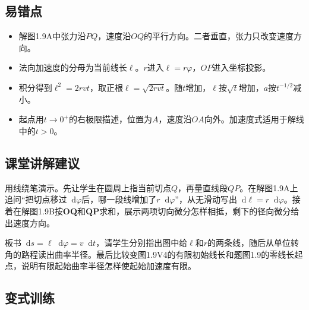 \documentclass[UTF8,fontset=fandol,a4paper,11pt]{ctexart}
\newcommand{\dd}{\mathop{}\!\mathrm{d}}
\newcommand{\vect}[1]{\bm{#1}}
\begin{document}


\subsection*{易错点}

\begin{itemize}
\item 解图1.9A中张力沿$PQ$，速度沿$OQ$的平行方向。二者垂直，张力只改变速度方向。
\item 法向加速度的分母为当前线长$\ell$。$r$进入$\ell=r\varphi$，$OP$进入坐标投影。
\item 积分得到$\ell^2=2rvt$，取正根$\ell=\sqrt{2rvt}$。随$t$增加，$\ell$按$\sqrt t$增加，$a$按$t^{-1/2}$减小。
\item 起点用$t\to0^+$的右极限描述，位置为$A$，速度沿$OA$向外。加速度式适用于解线中的$t>0$。
\end{itemize}



\subsection*{课堂讲解建议}

用线绕笔演示。先让学生在圆周上指当前切点$Q$，再量直线段$QP$。在解图1.9A上追问“把切点移过$\dd\varphi$后，哪一段线增加了$r\dd\varphi$”，从无滑动写出$\dd\ell=r\dd\varphi$。接着在解图1.9B按$\vect{OQ}$和$\vect{QP}$求和，展示两项切向微分怎样相抵，剩下的径向微分给出速度方向。

板书$\dd s=\ell\dd\varphi=v\dd t$，请学生分别指出图中给$\ell$和$r$的两条线，随后从单位转角的路程读出曲率半径。最后比较变图1.9V4的有限初始线长和题图1.9的零线长起点，说明有限起始曲率半径怎样使起始加速度有限。



\subsection*{变式训练}
\end{document}
